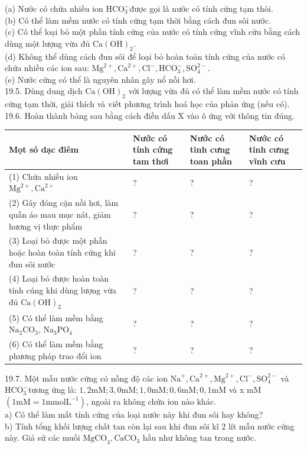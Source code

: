 \documentclass[10pt]{article}
\begin{document}
(a) Nước có chứa nhiều ion $\mathrm{HCO}_{3}^{-}$được gọi là nước có tính cứng tạm thòi.\\
(b) Có thể làm mềm nước có tính cứng tạm thời bằng cách đun sôi nước.\\
(c) Có thể loại bỏ một phần tính cứng của nước có tính cứng vĩnh cửu bằng cách dùng một lượng vừa đủ $\mathrm{Ca}(\mathrm{OH})_{2}$.\\
(d) Không thể dùng cách đun sôi để loại bỏ hoàn toàn tính cứng của nước có chứa nhiều các ion sau: $\mathrm{Mg}^{2+}, \mathrm{Ca}^{2+}, \mathrm{Cl}^{-}, \mathrm{HCO}_{3}^{-}, \mathrm{SO}_{4}^{2-}$.\\
(e) Nước cứng có thể là nguyên nhân gây nổ nồi hơi.\\
19.5. Dùng dung dịch $\mathrm{Ca}(\mathrm{OH})_{2}$ với lượng vừa đủ có thể làm mềm nước có tính cứng tạm thời, giải thích và viết phương trình hoá học của phản ứng (nếu có).\\
19.6. Hoàn thành bảng sau bằng cách điền dấu X vào ô ứng với thông tin đúng.

\begin{center}
\begin{tabular}{|l|l|l|l|}
\hline
Mọt só dạc điêm & Nước có tính cứng tam thơi & Nước có tinh cưng toan phần & Nước có tinh cưng vĩnh cưu \\
\hline
(1) Chứa nhiều ion $\mathrm{Mg}^{2+}, \mathrm{Ca}^{2+}$ & ? & ? & ? \\
\hline
(2) Gây đóng cặn nồi hơi, làm quần áo mau mục nát, giảm hương vị thực phẩm & ? & ? & ? \\
\hline
(3) Loại bỏ được một phần hoặc hoàn toàn tính cứng khi đun sôi nước & ? & ? & ? \\
\hline
(4) Loại bỏ được hoàn toàn tính cúng khi dùng lượng vừa đủ $\mathrm{Ca}(\mathrm{OH})_{2}$ & ? & ? & ? \\
\hline
(5) Có thể làm mềm bằng $\mathrm{Na}_{2} \mathrm{CO}_{3}$, $\mathrm{Na}_{3} \mathrm{PO}_{4}$ & ? & ? & ? \\
\hline
(6) Có thể làm mềm bằng phương pháp trao đổi ion & ? & ? & ? \\
\hline
\end{tabular}
\end{center}

19.7. Một mẫu nước cứng có nồng độ các ion $\mathrm{Na}^{+}, \mathrm{Ca}^{2+}, \mathrm{Mg}^{2+}, \mathrm{Cl}^{-}, \mathrm{SO}_{4}^{2-}$ và $\mathrm{HCO}_{3}^{-}$tương ứng là: $1,2 \mathrm{mM} ; 3,0 \mathrm{mM} ; 1,0 \mathrm{mM} ; 0,6 \mathrm{mM} ; 0,1 \mathrm{mM}$ và x mM $\left(1 \mathrm{mM}=1 \mathrm{mmol} \mathrm{L}^{-1}\right)$, ngoài ra không chứa ion nào khác.\\
a) Có thể làm mất tính cứng của loại nước này khi đun sôi hay không?\\
b) Tính tổng khối lượng chất tan còn lại sau khi đun sôi kĩ 2 lít mẫu nước cứng này. Giả sử các muối $\mathrm{MgCO}_{3}, \mathrm{CaCO}_{3}$ hầu như không tan trong nước.
\end{document}
